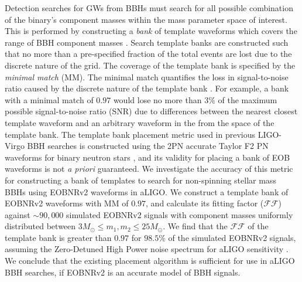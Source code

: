 \documentclass[aps,
prd,
amsmath,
amssymb,
twocolumn,
floatfix,
groupedaddress]{revtex4-1}
\newcommand{\FF}{\mathcal{FF}}
\newcommand{\MM}{\mathrm{MM}}
\begin{document}
Detection searches for GWs from BBHs must search for all possible combination of the binary's component masses within the mass parameter space of interest. This is performed by constructing a \textit{bank} of template waveforms which covers the range of BBH component masses \citep{Sathyaprakash:1991mt,Balasubramanian:1995bm}. Search template banks are constructed such that no more than a pre-specified fraction of the total events are lost due to the discrete nature of the grid. The coverage of the template bank is specified by the \textit{minimal match} ($\MM$). The minimal match quantifies the loss in signal-to-noise ratio caused by the discrete nature of the template bank \citep{FittingFactorApostolatos}. For example, a bank with a minimal match of $0.97$ would lose no more than $3\%$ of the maximum possible signal-to-noise ratio (SNR) due to differences between the nearest closest template waveform and an arbitrary waveform in the from the space of the template bank. The template bank placement metric 
used in previous LIGO-Virgo BBH searches is constructed using the 2PN accurate Taylor F2 PN waveforms for binary neutron stars \citep{OwenTemplateSpacing,SathyaBankPlacementTauN,BabaketalBankPlacement,SathyaMetric2PN}, and its validity for placing a bank of EOB waveforms is not \textit{a priori} guaranteed. We investigate the accuracy of this metric for constructing a bank of templates to search for non-spinning stellar mass BBHs using EOBNRv2 waveforms in aLIGO. We construct a template bank of EOBNRv2 waveforms with $\MM$ of $0.97$, and calculate its fitting factor ($\FF$) against $\sim 90,000$ simulated EOBNRv2 signals with component masses uniformly distributed between $3 M_{\odot} \le m_1,m_2 \le 25 M_{\odot}$. We find that the $\FF$ of the template bank is greater than $0.97$ for $98.5\%$ of the simulated EOBNRv2 signals, assuming the Zero-Detuned High Power noise spectrum for aLIGO sensitivity \citep{aLIGONoiseCurve}. We conclude that the existing placement algorithm is sufficient for use in aLIGO BBH 
searches, if EOBNRv2 is an accurate model of BBH signals.
\end{document}
